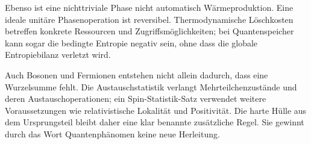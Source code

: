 Ebenso ist eine nichttriviale Phase nicht automatisch Wärmeproduktion. Eine ideale unitäre Phasenoperation ist reversibel. Thermodynamische Löschkosten betreffen konkrete Ressourcen und Zugriffsmöglichkeiten; bei Quantenspeicher kann sogar die bedingte Entropie negativ sein, ohne dass die globale Entropiebilanz verletzt wird. 

Auch Bosonen und Fermionen entstehen nicht allein dadurch, dass eine Wurzelsumme fehlt. Die Austauschstatistik verlangt Mehrteilchenzustände und deren Austauschoperationen; ein Spin-Statistik-Satz verwendet weitere Voraussetzungen wie relativistische Lokalität und Positivität. Die \glqq harte Hülle\grqq{} aus dem Ursprungsteil bleibt daher eine klar benannte zusätzliche Regel. Sie gewinnt durch das Wort Quantenphänomen keine neue Herleitung.
